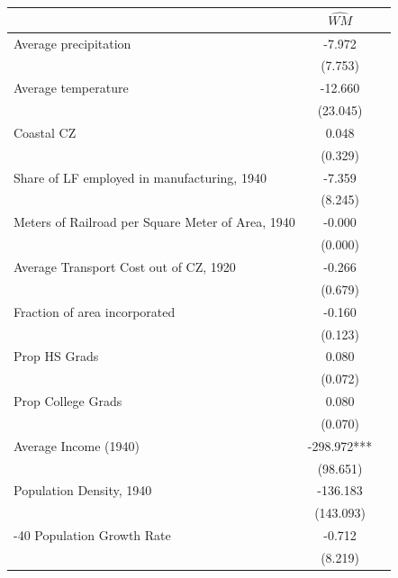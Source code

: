  \begin{tabular}{l*{2}{c}} \toprule
                &\multicolumn{1}{c}{$\widehat{WM}$}\\
\midrule
Average precipitation&   -7.972   \\
                &  (7.753)   \\
\addlinespace
Average temperature&  -12.660   \\
                & (23.045)   \\
\addlinespace
Coastal CZ      &    0.048   \\
                &  (0.329)   \\
\addlinespace
Share of LF employed in manufacturing, 1940&   -7.359   \\
                &  (8.245)   \\
\addlinespace
Meters of Railroad per Square Meter of Area, 1940&   -0.000   \\
                &  (0.000)   \\
\addlinespace
Average Transport Cost out of CZ, 1920&   -0.266   \\
                &  (0.679)   \\
\addlinespace
Fraction of area incorporated&   -0.160   \\
                &  (0.123)   \\
\addlinespace
Prop HS Grads   &    0.080   \\
                &  (0.072)   \\
\addlinespace
Prop College Grads&    0.080   \\
                &  (0.070)   \\
\addlinespace
Average Income (1940)& -298.972***\\
                & (98.651)   \\
\addlinespace
Population Density, 1940& -136.183   \\
                &(143.093)   \\
\addlinespace
1930-40 Population Growth Rate&   -0.712   \\
                &  (8.219)   \\
       \bottomrule \end{tabular}
